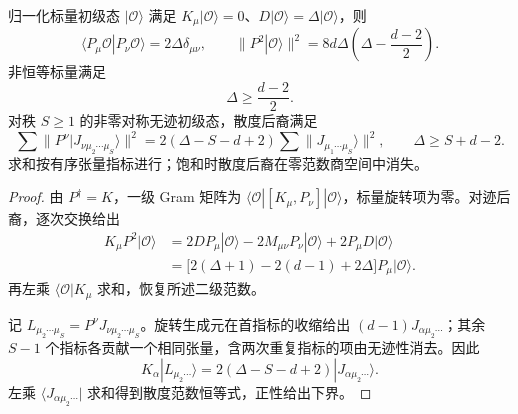 \begin{proposition}[幺正界与散度范数]
归一化标量初级态 $|\mathcal O\rangle$ 满足 $K_\mu|\mathcal O\rangle=0$、$D|\mathcal O\rangle=\Delta|\mathcal O\rangle$，则
\begin{equation}\label{eq:ghs-scalar-level-one-gram}
 \langle P_\mu\mathcal O|P_\nu\mathcal O\rangle=2\Delta\delta_{\mu\nu},\qquad
 \|P^2|\mathcal O\rangle\|^2=8d\Delta\left(\Delta-\frac{d-2}{2}\right).
\end{equation}
非恒等标量满足
\begin{equation}\label{eq:ghs-scalar-unitarity-bound}
 \Delta\ge\frac{d-2}{2}.
\end{equation}
对秩 $S\ge1$ 的非零对称无迹初级态，散度后裔满足
\begin{equation}\label{eq:ghs-spin-unitarity-bound-extended}
 \sum\|P^\nu|J_{\nu\mu_2\cdots\mu_S}\rangle\|^2
 =2(\Delta-S-d+2)\sum\|J_{\mu_1\cdots\mu_S}\rangle\|^2,
 \qquad\Delta\ge S+d-2.
\end{equation}
求和按有序张量指标进行；饱和时散度后裔在零范数商空间中消失。
\end{proposition}
\begin{proof}
由 $P^\dagger=K$，一级 Gram 矩阵为 $\langle\mathcal O|[K_\mu,P_\nu]|\mathcal O\rangle$，标量旋转项为零。对迹后裔，逐次交换给出
\begin{align*}
 K_\mu P^2|\mathcal O\rangle
 &=2DP_\mu|\mathcal O\rangle-2M_{\mu\nu}P_\nu|\mathcal O\rangle
   +2P_\mu D|\mathcal O\rangle\\
 &=\bigl[2(\Delta+1)-2(d-1)+2\Delta\bigr]P_\mu|\mathcal O\rangle.
\end{align*}
再左乘 $\langle\mathcal O|K_\mu$ 求和，恢复所述二级范数。

记 $L_{\mu_2\cdots\mu_S}=P^\nu J_{\nu\mu_2\cdots\mu_S}$。旋转生成元在首指标的收缩给出 $(d-1)J_{\alpha\mu_2\cdots}$；其余 $S-1$ 个指标各贡献一个相同张量，含两次重复指标的项由无迹性消去。因此
\[
 K_\alpha|L_{\mu_2\cdots}\rangle=2(\Delta-S-d+2)|J_{\alpha\mu_2\cdots}\rangle.
\]
左乘 $\langle J_{\alpha\mu_2\cdots}|$ 求和得到散度范数恒等式，正性给出下界。
\end{proof}
